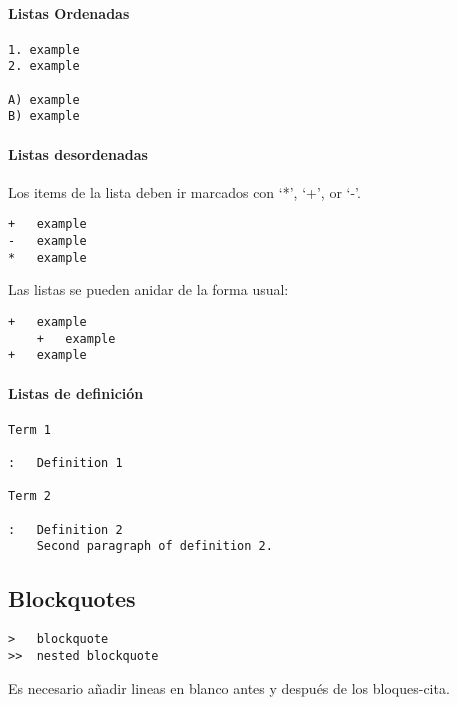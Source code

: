 \documentclass[12pt,spanish,]{article}
\let\oldparagraph\paragraph
\renewcommand{\paragraph}[1]{\oldparagraph{#1}\mbox{}}
\begin{document}
\hypertarget{listas-ordenadas}{%
\paragraph{Listas Ordenadas}\label{listas-ordenadas}}

\begin{verbatim}
1. example
2. example

A) example
B) example
\end{verbatim}

\hypertarget{listas-desordenadas}{%
\paragraph{Listas desordenadas}\label{listas-desordenadas}}

Los items de la lista deben ir marcados con `*', `+', or `-'.

\begin{verbatim}
+   example
-   example
*   example
\end{verbatim}

Las listas se pueden anidar de la forma usual:

\begin{verbatim}
+   example
    +   example
+   example
\end{verbatim}

\hypertarget{listas-de-definiciuxf3n}{%
\paragraph{Listas de definición}\label{listas-de-definiciuxf3n}}

\begin{verbatim}
Term 1

:   Definition 1

Term 2

:   Definition 2
    Second paragraph of definition 2.
\end{verbatim}

\hypertarget{blockquotes}{%
\subsection{Blockquotes}\label{blockquotes}}

\begin{verbatim}
>   blockquote
>>  nested blockquote
\end{verbatim}

Es necesario añadir lineas en blanco antes y después de los
bloques-cita.
\end{document}
